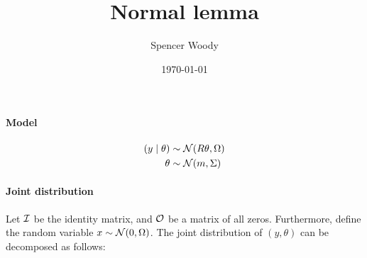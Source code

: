 \documentclass[letter, 10pt]{article}
\title{Normal lemma}
\author{Spencer Woody}
\date{\today}
\begin{document}
\maketitle


\paragraph{Model}


\begin{align*}
  (y \mid \theta) &\sim \mathcal{N}(R\theta, \Omega) \\
  \theta &\sim \mathcal{N}(m, \Sigma)
\end{align*}

\paragraph{Joint distribution}

Let $\mathcal{I}$ be the identity matrix, and $\mathcal{O}$ be a matrix of all
zeros. Furthermore, define the random variable $x \sim \mathcal{N}(0,
\Omega)$. The joint distribution of $(y, \theta)$ can be decomposed as
follows:
\end{document}
